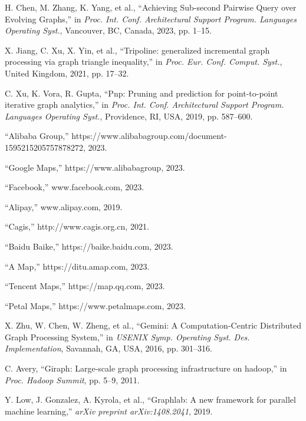 \documentclass[lettersize,journal]{IEEEtran} %
\begin{document}
\begin{thebibliography}{100}
  
  
  H. Chen, M. Zhang, K. Yang, et al., ``Achieving Sub-second Pairwise Query over Evolving Graphs,'' in \textit{Proc. Int. Conf. Architectural Support Program. Languages Operating Syst.}, Vancouver, BC, Canada, 2023, pp. 1--15.
  
  X. Jiang, C. Xu, X. Yin, et al., ``Tripoline: generalized incremental graph processing via graph triangle inequality,'' in \textit{Proc. Eur. Conf. Comput. Syst.}, United Kingdom, 2021, pp. 17--32.
  
  C. Xu, K. Vora, R. Gupta, ``Pnp: Pruning and prediction for point-to-point iterative graph analytics,'' in \textit{Proc. Int. Conf. Architectural Support Program. Languages Operating Syst.}, Providence, RI, USA, 2019, pp. 587--600.
  
  ``Alibaba Group,'' https://www.alibabagroup.com/document-1595215205757878272, 2023.
  
  
  ``Google Maps,'' https://www.alibabagroup, 2023.
  
  ``Facebook,'' www.facebook.com, 2023.
  
  ``Alipay,'' www.alipay.com, 2019.
  
  ``Cagis,'' http://www.cagis.org.cn, 2021.
  
  ``Baidu Baike,'' https://baike.baidu.com, 2023.
  
  ``A Map,'' https://ditu.amap.com, 2023.
  
  ``Tencent Maps,'' https://map.qq.com, 2023.
  
  ``Petal Maps,'' https://www.petalmaps.com, 2023.
  
  X. Zhu, W. Chen, W. Zheng, et al., ``Gemini: A {Computation-Centric} Distributed Graph Processing System,'' in \textit{USENIX Symp. Operating Syst. Des. Implementation}, Savannah, GA, USA, 2016, pp. 301--316.
  
  C. Avery, ``Giraph: Large-scale graph processing infrastructure on hadoop,'' in \textit{Proc. Hadoop Summit}, pp. 5--9, 2011.
  
  Y. Low, J. Gonzalez, A. Kyrola, et al., ``Graphlab: A new framework for parallel machine learning,'' \textit{arXiv preprint arXiv:1408.2041}, 2019.
  

\end{thebibliography}
\end{document}
